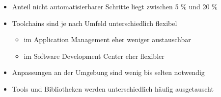 \begin{flushleft}
    \begin{itemize}
        \item Anteil nicht automatisierbarer Schritte liegt zwischen 5 \% und 20 \%
        \item Toolchains sind je nach Umfeld unterschiedlich flexibel
        \begin{itemize}
            \item im Application Management eher weniger austauschbar
            \item im Software Development Center eher flexibler
        \end{itemize}
        \item Anpassungen an der Umgebung sind wenig bis selten notwendig
        \item Tools und Bibliotheken werden unterschiedlich häufig ausgetauscht
    \end{itemize}
\end{flushleft}
